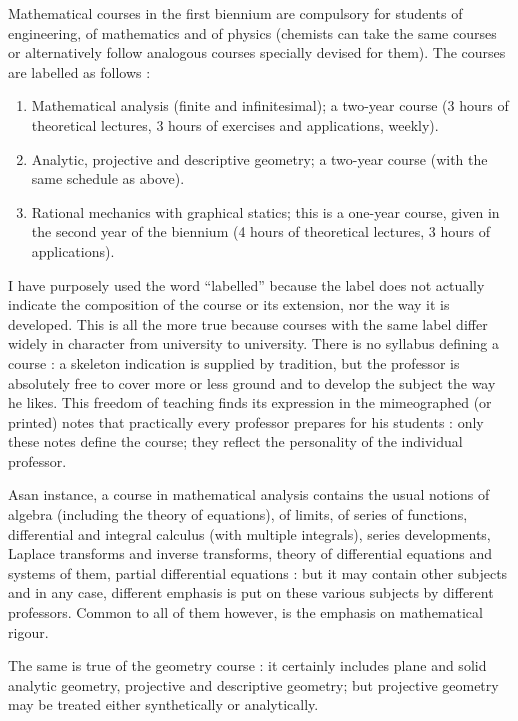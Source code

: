 Mathematical courses in the first biennium are compulsory for students of engineering, of mathematics and of physics (chemists can take the same courses or alternatively follow analogous courses specially devised for them). The courses are labelled as follows :
\begin{enumerate}
\item Mathematical analysis (finite and infinitesimal); a two-year course (3 hours of theoretical lectures, 3 hours of exercises and applications, weekly).

\item Analytic, projective and descriptive geometry; a two-year course (with the same schedule as above).

\item Rational mechanics with graphical statics; this is a one-year course, given in the second year of the biennium (4 hours of theoretical lectures, 3 hours of applications).
\end{enumerate}

I have purposely used the word ``labelled'' because the label does not actually indicate the composition of the course or its extension, nor the way it is developed. This is all the more true because courses with the same label differ widely in character from university to university. There is no syllabus defining a course : a skeleton indication is supplied by tradition, but the professor is absolutely free to cover more or less ground and to develop the subject the way he likes. This freedom of teaching finds its expression in the mimeographed (or printed) notes that practically every professor prepares for his students : only these notes define the course; they reflect the personality of the individual professor.

As\pageoriginale an instance, a course in mathematical analysis contains the usual notions of algebra (including the theory of equations), of limits, of series of functions, differential and integral calculus (with multiple integrals), series developments, Laplace transforms and inverse transforms, theory of differential equations and systems of them, partial differential equations : but it may contain other subjects and in any case, different emphasis is put on these various subjects by different professors. Common to all of them however, is the emphasis on mathematical rigour.

The same is true of the geometry course : it certainly includes plane and solid analytic geometry, projective and descriptive geometry; but projective geometry may be treated either synthetically or analytically.

